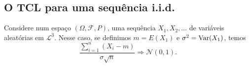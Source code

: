\newpage

\subsection{O TCL para uma sequência i.i.d.}

\begin{theorem}
  \label{:tcl_iid}
  Considere num espaço $(\Omega, \mathcal{F}, P)$, uma sequência $X_1, X_2, \dots$ de variáveis aleatórias \iid em $\mathcal{L}^3$.
  Nesse caso, se definimos $m = E(X_1)$ e $\sigma^2 = \operatorname{Var}(X_1)$, temos
  \begin{equation}
    \frac{\sum_{i=1}^n (X_i - m)}{\sigma \sqrt{n}} \Rightarrow \mathcal{N}(0,1).
  \end{equation}
\end{theorem}

